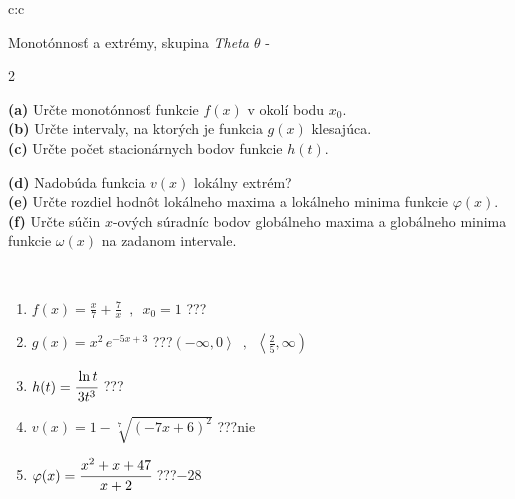 \documentclass[10pt]{report}
\begin{document}
\newpage
\thispagestyle{empty}
\begin{tabular}{c:c}
\begin{minipage}[c][104.5mm][t]{0.5\linewidth}
\begin{center}
\vspace{7mm}
{\huge Monotónnosť a extrémy, skupina \textit{Theta $\theta$} -}\\[5mm]
\begin{minipage}{0.95\linewidth}
\begin{center}
{\small \begin{multicols}{2} \raggedright
\textbf{(a)} Určte monotónnosť funkcie \(f(x)\) v okolí bodu \(x_0\). \\[1mm]
\textbf{(b)} Určte intervaly, na ktorých je funkcia \(g(x)\) klesajúca. \\[1mm]
\textbf{(c)} Určte počet stacionárnych bodov funkcie \(h(t)\). \par \columnbreak
\textbf{(d)} Nadobúda funkcia \(v(x)\) lokálny extrém? \\[1mm]
\textbf{(e)} Určte rozdiel hodnôt lokálneho maxima a lokálneho minima funkcie \(\varphi(x)\). \\[1mm]
\textbf{(f)} Určte súčin \(x\)-ových súradníc bodov globálneho maxima a globálneho minima funkcie \(\omega(x)\) na zadanom intervale. \\[1mm]
\end{multicols}
}
\end{center}
\end{minipage}
\\[4mm]
\begin{minipage}{0.79\linewidth}
\begin{center}
\begin{varwidth}{\linewidth}
\begin{enumerate}
\normalsize
\item $f(x)=\frac{x}{7}+\frac{7}{x} \enspace , \enspace x_0=1$\quad \dotfill\; ???\;\dotfill \quad {}
\item $g(x)=x^2\, e^{-5x+3}$\quad \dotfill\; ???\;\dotfill \quad $\left(-\infty , 0\right\rangle\enspace , \enspace \left\langle\frac{2}{5} , \infty\right)$
\item $h(t)=\cfrac{\ln t}{3t^3}$\quad \dotfill\; ???\;\dotfill {}
\item $v(x)=1-\sqrt[7]{(-7x+6)^2}$\quad \dotfill\; ???\;\dotfill \quad $\text{nie}$
\item $\varphi(x)=\cfrac{x^2+x+47}{x+2}$\quad \dotfill\; ???\;\dotfill \quad $-28$

\end{enumerate}
\end{varwidth}
\end{center}
\end{minipage}
\end{center}
\end{minipage}
\end{tabular}
\end{document}
